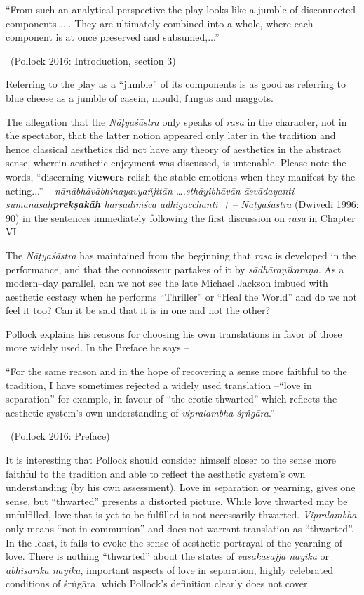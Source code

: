 \begin{myquote}
“From such an analytical perspective the play looks like a jumble of disconnected components…... They are ultimately combined into a whole, where each component is at once preserved and subsumed,...” 

~\hfill (Pollock 2016: Introduction, section 3)
\end{myquote}

Referring to the play as a “jumble” of its components is as good as referring to blue cheese as a jumble of casein, mould, fungus and maggots.

The allegation that the \textit{Nāṭyaśāstra} only speaks of \textit{rasa} in the character, not in the spectator, that the latter notion appeared only later in the tradition and hence classical aesthetics did not have any theory of aesthetics in the abstract sense, wherein aesthetic enjoyment was discussed, is untenable. Please note the words, “discerning \textbf{viewers} relish the stable emotions when they manifest by the acting...” – \textit{nānābhāvābhinayavyañjitān ….sthāyibhāvān āsvādayanti sumanasaḥ\textbf{prekṣakāḥ} harṣādīṁśca adhigacchanti~।} – \textit{Nāṭyaśastra} (Dwivedi 1996: 90) in the sentences immediately following the first discussion on \textit{rasa }in Chapter VI.

The \textit{Nāṭyaśāstra} has maintained from the beginning that \textit{rasa} is developed in the performance, and that the connoisseur partakes of it by \textit{sādhāraṇīkaraṇa}. As a modern–day parallel, can we not see the late Michael Jackson imbued with aesthetic ecstasy when he performs “Thriller” or “Heal the World” and do we not feel it too? Can it be said that it is in one and not the other?

Pollock explains his reasons for choosing his own translations in favor of those more widely used. In the Preface he says –

\begin{myquote}
“For the same reason and in the hope of recovering a sense more faithful to the tradition, I have sometimes rejected a widely used translation –“love in separation” for example, in favour of “the erotic thwarted” which reflects the aesthetic system’s own understanding of \textit{vipralambha śṛṅgāra}.” 

~\hfill (Pollock 2016: Preface)
\end{myquote}

It is interesting that Pollock should consider himself closer to the sense more faithful to the tradition and able to reflect the aesthetic system’s own understanding (by his own assessment). Love in separation or yearning, gives one sense, but “thwarted” presents a distorted picture. While love thwarted may be unfulfilled, love that is yet to be fulfilled is not necessarily thwarted. \textit{Vipralambha} only means “not in communion” and does not warrant translation as “thwarted”. In the least, it fails to evoke the sense of aesthetic portrayal of the yearning of love. There is nothing “thwarted” about the states of \textit{vāsakasajjā nāyikā} or \textit{abhisārikā nāyikā}, important aspects of love in separation, highly celebrated conditions of śṛṅgāra, which Pollock’s definition clearly does not cover.


